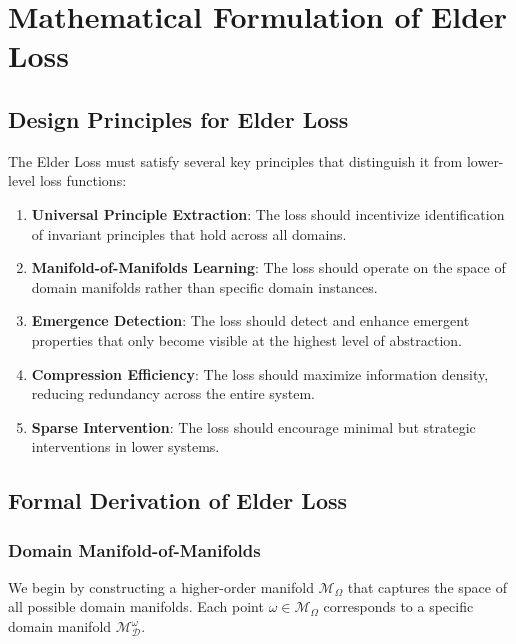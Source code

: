 \section{Mathematical Formulation of Elder Loss}

\subsection{Design Principles for Elder Loss}

The Elder Loss must satisfy several key principles that distinguish it from lower-level loss functions:

\begin{enumerate}
\item \textbf{Universal Principle Extraction}: The loss should incentivize identification of invariant principles that hold across all domains.

\item \textbf{Manifold-of-Manifolds Learning}: The loss should operate on the space of domain manifolds rather than specific domain instances.

\item \textbf{Emergence Detection}: The loss should detect and enhance emergent properties that only become visible at the highest level of abstraction.

\item \textbf{Compression Efficiency}: The loss should maximize information density, reducing redundancy across the entire system.

\item \textbf{Sparse Intervention}: The loss should encourage minimal but strategic interventions in lower systems.
\end{enumerate}

\subsection{Formal Derivation of Elder Loss}

\subsubsection{Domain Manifold-of-Manifolds}

We begin by constructing a higher-order manifold $\mathcal{M}_{\Omega}$ that captures the space of all possible domain manifolds. Each point $\omega \in \mathcal{M}_{\Omega}$ corresponds to a specific domain manifold $\mathcal{M}_{\mathcal{D}}^{\omega}$.

